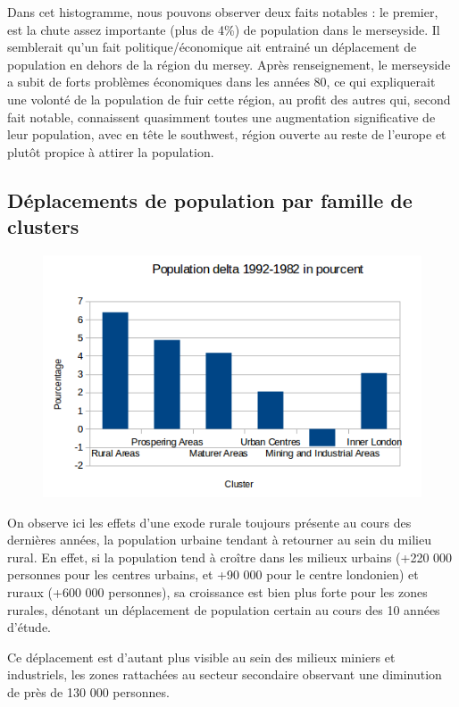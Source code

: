 Dans cet histogramme, nous pouvons observer deux faits notables : le premier, est la chute assez importante (plus de 4\%) de population dans le merseyside. Il semblerait qu'un fait politique/économique ait entrainé un déplacement de population en dehors de la région du mersey. Après renseignement, le merseyside a subit de forts problèmes économiques dans les années 80, ce qui expliquerait une volonté de la population de fuir cette région, au profit des autres qui, second fait notable, connaissent quasimment toutes une augmentation significative de leur population, avec en tête le southwest, région ouverte au reste de l'europe et plutôt propice à attirer la population.



\pagebreak


\subsection{Déplacements de population par famille de clusters}

\begin{figure}[h!]
    \centering
    \includegraphics[width=\linewidth]{images/pop/deltaPopFamilleCluster.png}
\end{figure}

On observe ici les effets d'une exode rurale toujours présente au cours des dernières années, la population urbaine tendant à retourner au sein du milieu rural. En effet, si la population tend à croître dans les milieux urbains (+220 000 personnes pour les centres urbains, et +90 000 pour le centre londonien) et ruraux (+600 000 personnes), sa croissance est bien plus forte pour les zones rurales, dénotant un déplacement de population certain au cours des 10 années d'étude.

Ce déplacement est d'autant plus visible au sein des milieux miniers et industriels, les zones rattachées au secteur secondaire observant une diminution de près de 130 000 personnes.
\pagebreak
